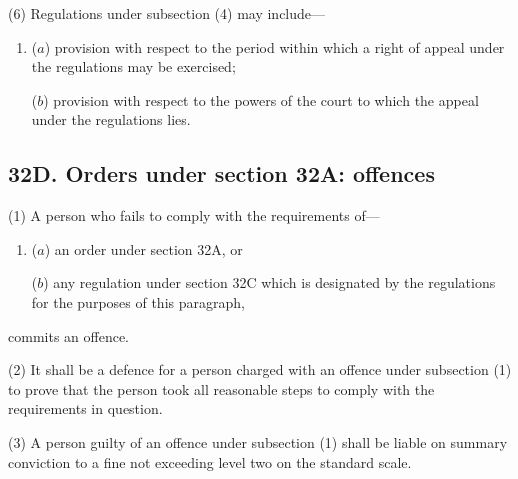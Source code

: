 \documentclass[a4paper]{article}
\begin{document}
(6)
Regulations under subsection (4) may include---
\begin{enumerate}\item[]
($a$) provision with respect to the period within which a right of appeal under the regulations may be exercised;

($b$) provision with respect to the powers of the court to which the appeal under the regulations lies.
\end{enumerate}


\subsection{32D. Orders under section 32A: offences}

(1) A person who fails to comply with the requirements of---
\begin{enumerate}\item[]
($a$) an order under section 32A, or

($b$) any regulation under section 32C which is designated by the regulations for
the purposes of this paragraph, 
\end{enumerate}
commits an offence.

(2)
It shall be a defence for a person charged with an offence under subsection (1) to prove that the person took all reasonable steps to comply with the requirements in question.

(3)
A person guilty of an offence under subsection (1) shall be liable on summary conviction to a fine not exceeding level two on the standard scale.

\end{document}

